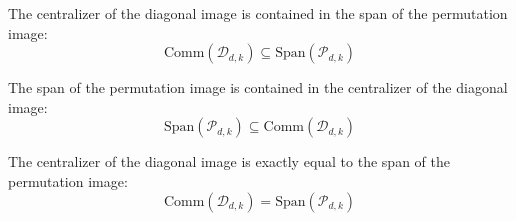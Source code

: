 \begin{theorem}\label{thm:centralizer_diagImage_le_span_permImage}
  \leanok
  The centralizer of the diagonal image is contained in the span of the permutation image:
  \begin{equation}
    \text{Comm}(\mathcal{D}_{d,k}) \subseteq \text{Span}(\mathcal{P}_{d,k})
  \end{equation}
\end{theorem}

\begin{theorem}\label{thm:span_permImage_le_centralizer_diagImage}
  \leanok
  The span of the permutation image is contained in the centralizer of the diagonal image:
  \begin{equation}
    \text{Span}(\mathcal{P}_{d,k}) \subseteq \text{Comm}(\mathcal{D}_{d,k})
  \end{equation}
\end{theorem}

\begin{theorem}\label{thm:schur_weyl}
  \leanok
  The centralizer of the diagonal image is exactly equal to the span of the permutation image:
  \begin{equation}
    \text{Comm}(\mathcal{D}_{d,k}) = \text{Span}(\mathcal{P}_{d,k})
  \end{equation}
\end{theorem}
